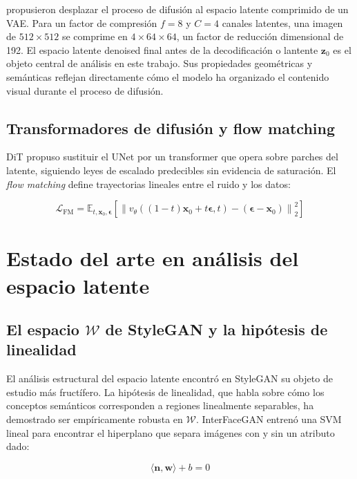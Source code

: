 \documentclass[12pt, a4paper, twoside]{book}
\newcommand{\z}{\mathbf{z}}
\newcommand{\x}{\mathbf{x}}
\newcommand{\eps}{\boldsymbol{\epsilon}}
\newcommand{\E}{\mathbb{E}}
\begin{document}
\citet{rombach2022ldm} propusieron desplazar el proceso de difusión al espacio latente comprimido de un VAE. Para un factor de compresión $f = 8$ y $C = 4$ canales latentes, una imagen de $512 \times 512$ se comprime en $4 \times 64 \times 64$, un factor de reducción dimensional de 192. El espacio latente denoised final antes de la decodificación o lantente $\z_0$ es el objeto central de análisis en este trabajo. Sus propiedades geométricas y semánticas reflejan directamente cómo el modelo ha organizado el contenido visual durante el proceso de difusión.

\subsection{Transformadores de difusión y flow matching}

DiT \citep{peebles2023dit} propuso sustituir el UNet por un transformer que opera sobre parches del latente, siguiendo leyes de escalado predecibles sin evidencia de saturación. El \textit{flow matching} \citep{lipman2022flowmatching,liu2022rectified} define trayectorias lineales entre el ruido y los datos:

\begin{equation}
\mathcal{L}_{\text{FM}} = \E_{t, \x_0, \eps}\!\left[\left\|v_\theta((1-t)\x_0 + t\eps, t) - (\eps - \x_0)\right\|_2^2\right]
\end{equation}

\section{Estado del arte en análisis del espacio latente}
\label{sec:sota}

\subsection{El espacio $\mathcal{W}$ de StyleGAN y la hipótesis de linealidad}

El análisis estructural del espacio latente encontró en StyleGAN \citep{karras2019stylegan} su objeto de estudio más fructífero. La hipótesis de linealidad, que habla sobre cómo los conceptos semánticos corresponden a regiones linealmente separables, ha demostrado ser empíricamente robusta en $\mathcal{W}$. InterFaceGAN \citep{shen2020interfacegan} entrenó una SVM lineal para encontrar el hiperplano que separa imágenes con y sin un atributo dado:

\begin{equation}
\langle \mathbf{n}, \mathbf{w} \rangle + b = 0
\end{equation}
\end{document}
